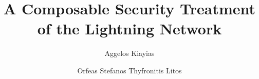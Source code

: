 \title{A Composable Security Treatment of the Lightning Network}
\author{Aggelos Kiayias \and Orfeas Stefanos Thyfronitis Litos}
\maketitle
